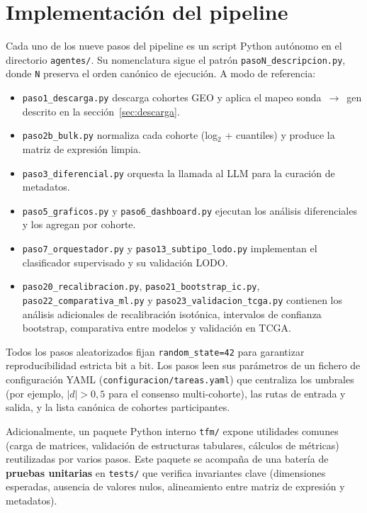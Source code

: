 \section{Implementación del pipeline}
\label{sec:dev_pipeline}

Cada uno de los nueve pasos del pipeline es un script Python autónomo
en el directorio \texttt{agentes/}. Su nomenclatura sigue el patrón
\texttt{pasoN\_descripcion.py}, donde \texttt{N} preserva el orden
canónico de ejecución. A modo de referencia:

\begin{itemize}[leftmargin=1.2em]
  \item \texttt{paso1\_descarga.py} descarga cohortes GEO y aplica el
  mapeo sonda~$\to$~gen descrito en la sección~\ref{sec:descarga}.
  \item \texttt{paso2b\_bulk.py} normaliza cada cohorte (log$_2$ +
  cuantiles) y produce la matriz de expresión limpia.
  \item \texttt{paso3\_diferencial.py} orquesta la llamada al LLM para
  la curación de metadatos.
  \item \texttt{paso5\_graficos.py} y \texttt{paso6\_dashboard.py}
  ejecutan los análisis diferenciales y los agregan por cohorte.
  \item \texttt{paso7\_orquestador.py} y \texttt{paso13\_subtipo\_lodo.py}
  implementan el clasificador supervisado y su validación LODO.
  \item \texttt{paso20\_recalibracion.py},
  \texttt{paso21\_bootstrap\_ic.py}, \texttt{paso22\_comparativa\_ml.py}
  y \texttt{paso23\_validacion\_tcga.py} contienen los análisis
  adicionales de recalibración isotónica, intervalos de confianza
  bootstrap, comparativa entre modelos y validación en TCGA.
\end{itemize}

Todos los pasos aleatorizados fijan \texttt{random\_state=42} para
garantizar reproducibilidad estricta bit a bit. Los pasos leen sus
parámetros de un fichero de configuración YAML
(\texttt{configuracion/tareas.yaml}) que centraliza los umbrales
(por ejemplo, $|d| > 0{,}5$ para el consenso multi-cohorte), las rutas
de entrada y salida, y la lista canónica de cohortes participantes.

Adicionalmente, un paquete Python interno \texttt{tfm/} expone
utilidades comunes (carga de matrices, validación de estructuras
tabulares, cálculos de métricas) reutilizadas por varios pasos. Este
paquete se acompaña de una batería de \textbf{pruebas unitarias} en
\texttt{tests/} que verifica invariantes clave (dimensiones esperadas,
ausencia de valores nulos, alineamiento entre matriz de expresión y
metadatos).

